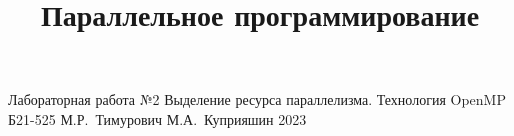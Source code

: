 \documentclass[a4paper,14pt]{memoir}
\begin{document}
\title{Параллельное программирование}
{Лабораторная работа №2}
{Выделение ресурса параллелизма. Технология OpenMP}
{Б21-525}
{М.\+Р.~Тимурович}
{М.\+А.~Куприяшин}
{2023}


\newpage
\end{document}
